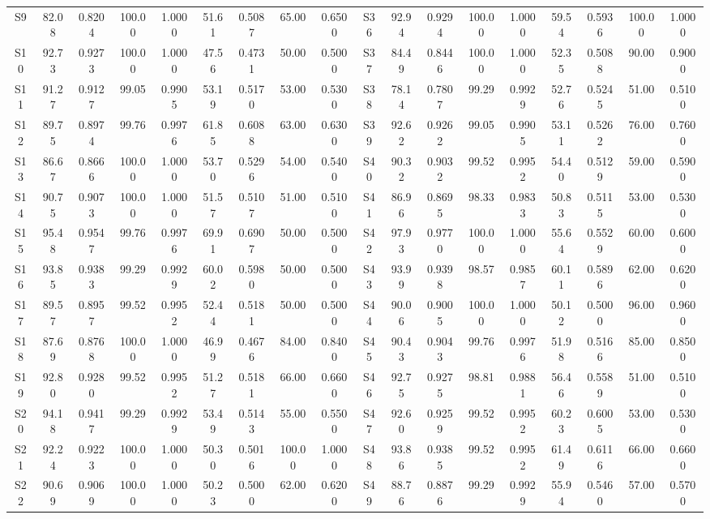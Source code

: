 \documentclass[conference]{IEEEtran}
\begin{document}
\begin{table}[t]
\begin{center}
{\begin{tabular}{|c|cc|cc||cc|cc||c|cc|cc||cc|cc|}
S9  & 82.08 & 0.8204 & 100.00 & 1.0000 & 51.61 & 0.5087 & 65.00 & 0.6500 &
S36 & 92.94 & 0.9294 & 100.00 & 1.0000 & 59.54 & 0.5936 & 100.00 & 1.0000 \\
S10 & 92.73 & 0.9273 & 100.00 & 1.0000 & 47.56 & 0.4731 & 50.00 & 0.5000 &
S37 & 84.49 & 0.8446 & 100.00 & 1.0000 & 52.35 & 0.5088 & 90.00 & 0.9000 \\
S11 & 91.27 & 0.9127 & 99.05 & 0.9905 & 53.19 & 0.5170 & 53.00 & 0.5300 &
S38 & 78.14 & 0.7807 & 99.29 & 0.9929 & 52.76 & 0.5245 & 51.00 & 0.5100 \\
S12 & 89.75 & 0.8974 & 99.76 & 0.9976 & 61.85 & 0.6088 & 63.00 & 0.6300 &
S39 & 92.62 & 0.9262 & 99.05 & 0.9905 & 53.11 & 0.5262 & 76.00 & 0.7600 \\
S13 & 86.67 & 0.8666 & 100.00 & 1.0000 & 53.70 & 0.5296 & 54.00 & 0.5400 &
S40 & 90.32 & 0.9032 & 99.52 & 0.9952 & 54.40 & 0.5129 & 59.00 & 0.5900 \\
S14 & 90.75 & 0.9073 & 100.00 & 1.0000 & 51.57 & 0.5107 & 51.00 & 0.5100 &
S41 & 86.96 & 0.8695 & 98.33 & 0.9833 & 50.83 & 0.5115 & 53.00 & 0.5300 \\
S15 & 95.48 & 0.9547 & 99.76 & 0.9976 & 69.91 & 0.6907 & 50.00 & 0.5000 &
S42 & 97.93 & 0.9770 & 100.00 & 1.0000 & 55.64 & 0.5529 & 60.00 & 0.6000 \\
S16 & 93.85 & 0.9383 & 99.29 & 0.9929 & 60.02 & 0.5980 & 50.00 & 0.5000 &
S43 & 93.99 & 0.9398 & 98.57 & 0.9857 & 60.11 & 0.5896 & 62.00 & 0.6200 \\
S17 & 89.57 & 0.8957 & 99.52 & 0.9952 & 52.44 & 0.5181 & 50.00 & 0.5000 &
S44 & 90.06 & 0.9005 & 100.00 & 1.0000 & 50.12 & 0.5000 & 96.00 & 0.9600 \\
S18 & 87.69 & 0.8768 & 100.00 & 1.0000 & 46.99 & 0.4676 & 84.00 & 0.8400 &
S45 & 90.43 & 0.9043 & 99.76 & 0.9976 & 51.98 & 0.5166 & 85.00 & 0.8500 \\
S19 & 92.80 & 0.9280 & 99.52 & 0.9952 & 51.27 & 0.5181 & 66.00 & 0.6600 &
S46 & 92.75 & 0.9275 & 98.81 & 0.9881 & 56.46 & 0.5589 & 51.00 & 0.5100 \\
S20 & 94.18 & 0.9417 & 99.29 & 0.9929 & 53.49 & 0.5143 & 55.00 & 0.5500 &
S47 & 92.60 & 0.9259 & 99.52 & 0.9952 & 60.23 & 0.6005 & 53.00 & 0.5300 \\
S21 & 92.24 & 0.9223 & 100.00 & 1.0000 & 50.30 & 0.5016 & 100.00 & 1.0000 &
S48 & 93.86 & 0.9385 & 99.52 & 0.9952 & 61.49 & 0.6116 & 66.00 & 0.6600 \\
S22 & 90.69 & 0.9069 & 100.00 & 1.0000 & 50.23 & 0.5000 & 62.00 & 0.6200 &
S49 & 88.76 & 0.8876 & 99.29 & 0.9929 & 55.94 & 0.5460 & 57.00 & 0.5700 \\

\end{tabular}}
\end{center}
\end{table}
\end{document}

